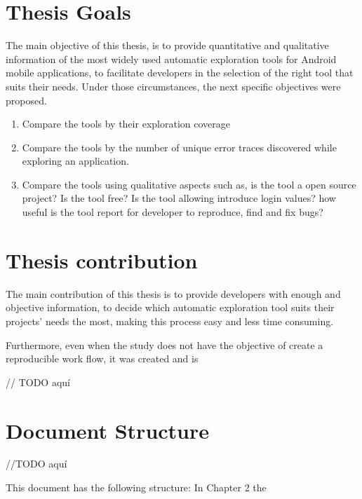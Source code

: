 \section{Thesis  Goals}\label{sec:thesisGoals}

The main objective of this thesis, is to provide quantitative and qualitative information of the most widely used automatic exploration tools for Android mobile applications, to facilitate developers in the selection of the right tool that suits their needs. Under those circumstances, the next specific objectives were proposed.
		\begin{enumerate}
			\item Compare the tools by their exploration coverage 
			\item Compare the tools by the number of unique error traces discovered while exploring an application.
			\item Compare the tools using qualitative aspects such as, is the tool a open source project? Is the tool free? Is the tool allowing introduce login values? how useful is the tool report for developer to reproduce, find and fix bugs?
		\end{enumerate}

\section{Thesis contribution} \label{sec:thesisContribution}

The main contribution of this thesis is to provide developers with enough and objective information, to decide which automatic exploration tool suits their projects' needs the most, making this process easy and less time consuming.

Furthermore, even when the study does not have the objective of create a reproducible work flow, it was created and is 


// TODO aquí

	
\section{Document Structure}
//TODO aquí

This document has the following structure: In Chapter 2 the 


